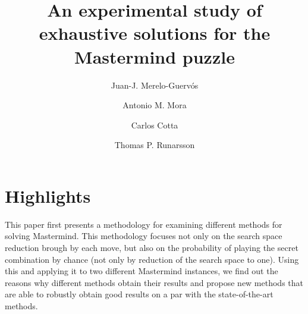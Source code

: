\documentclass[preprint,12pt]{elsarticle}
\begin{document}
\begin{frontmatter}

\title{An experimental study of exhaustive solutions for the Mastermind puzzle}

\author[ugr,citic]{Juan-J. Merelo-Guerv\'os}
\author[ugr,citic]{Antonio M. Mora}
\author[uma]{Carlos Cotta}
\author[hi]{Thomas P. Runarsson}
\address[ugr]{Dept. of Computer Architecture and Technology,
  University of Granada, Spain, \\ email: \{jmerelo,amorag\}@geneura.ugr.es}
\address[citic]{CITIC, \url{http://citic.ugr.es}}
\address[uma]{ Dept. of Languages and Computer
Sciences, University of M\'alaga, \\ email: ccottap@lcc.uma.es}
\address[hi]{School of Engineering and Natural Sciences, University of Iceland,\\ email: tpr@hi.is }


\end{frontmatter}

\section{Highlights}

This paper first presents a methodology for examining different
methods for solving Mastermind. This methodology focuses not only on
the search space reduction brough by each move, but also on the
probability of playing the secret combination by chance (not only by
reduction of the search space to one). Using this and applying it to
two different Mastermind instances, we find out the reasons why
different methods obtain their results and propose new methods that
are able to robustly obtain good results on a par with the
state-of-the-art methods. 
\end{document}

